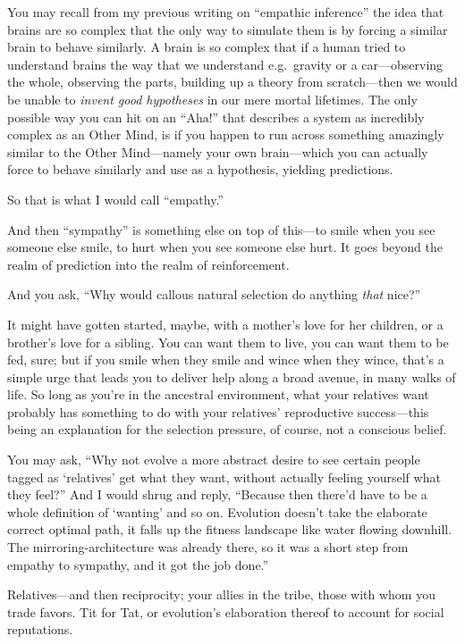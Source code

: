 {
 You may recall from my previous writing on
``empathic inference'' the idea that
brains are so complex that the only way to simulate them is by forcing
a similar brain to behave similarly. A brain is so complex that if a
human tried to understand brains the way that we understand e.g.~gravity
or a car---observing the whole, observing the parts, building
up a theory from scratch---then we would be unable to \textit{invent
good hypotheses} in our mere mortal lifetimes. The only possible way
you can hit on an ``Aha!'' that
describes a system as incredibly complex as an Other Mind, is if you
happen to run across something amazingly similar to the Other
Mind---namely your own brain---which you can actually force to behave
similarly and use as a hypothesis, yielding predictions.}

{
 So that is what I would call
``empathy.''}

{
 And then ``sympathy'' is
something else on top of this---to smile when you see someone else
smile, to hurt when you see someone else hurt. It goes beyond the realm
of prediction into the realm of reinforcement.}

{
 And you ask, ``Why would callous natural
selection do anything \textit{that} nice?''}

{
 It might have gotten started, maybe, with a
mother's love for her children, or a
brother's love for a sibling. You can want them to
live, you can want them to be fed, sure; but if you smile when they
smile and wince when they wince, that's a simple urge
that leads you to deliver help along a broad avenue, in many walks of
life. So long as you're in the ancestral environment,
what your relatives want probably has something to do with your
relatives' reproductive success---this being an
explanation for the selection pressure, of course, not a conscious
belief.}

{
 You may ask, ``Why not evolve a more abstract
desire to see certain people tagged as
`relatives' get what they want, without
actually feeling yourself what they feel?'' And I
would shrug and reply, ``Because then
there'd have to be a whole definition of
`wanting' and so on. Evolution
doesn't take the elaborate correct optimal path, it
falls up the fitness landscape like water flowing downhill. The
mirroring-architecture was already there, so it was a short step from
empathy to sympathy, and it got the job done.''}

{
 Relatives---and then reciprocity; your allies in the tribe, those
with whom you trade favors. Tit for Tat, or evolution's
elaboration thereof to account for social reputations.}

